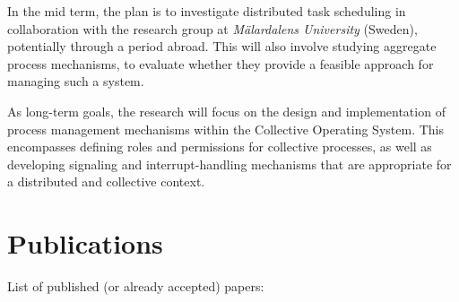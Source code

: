 \documentclass[runningheads]{llncs}
\begin{document}
    In the mid term,
    the plan is to investigate distributed task scheduling in collaboration with the research group at \emph{Mälardalens University} (Sweden),
    potentially through a period abroad.
%
    This will also involve studying aggregate process mechanisms,
    to evaluate whether they provide a feasible approach for managing such a system.

    As long-term goals,
    the research will focus on the design and implementation of process management mechanisms within the Collective Operating System.
%
    This encompasses defining roles and permissions for collective processes,
    as well as developing signaling and interrupt-handling mechanisms that are appropriate for a distributed and collective context.



    \section{Publications}\label{sec:publications}
    List of published (or already accepted) papers:
\end{document}
